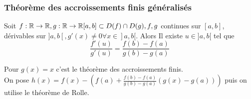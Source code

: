 \documentclass[12pt,a4paper]{article}
\begin{document}
{\subsubsection{Théorème des accroissements finis généralisés}
\begin{boite}
	\Theoreme Soit $f:\mathbb{R} \to \mathbb{R}, g:\mathbb{R} \to \mathbb{R} [a,b] \subset D(f) \cap D(g), f,g$ continues sur $[a,b]$, dérivables sur $]a,b[, g'(x) \neq 0 \forall x \in ]a,b[$. Alors Il existe $u \in ]a,b[$ tel que 
	\begin{equation}
		\frac{f'(u)}{g'(u)} = \frac{f(b)-f(a)}{g(b)-g(a)}
	\end{equation}
\end{boite}
Pour $g(x) = x$ c'est le théorème des accroissements finis.
\\
On pose $h(x) = f(x) - \left(f(a)+\frac{f(b)-f(a)}{g(b)-g(a)}(g(x)-g(a))\right)$ puis on utilise le théorème de Rolle.

}
\end{document}
